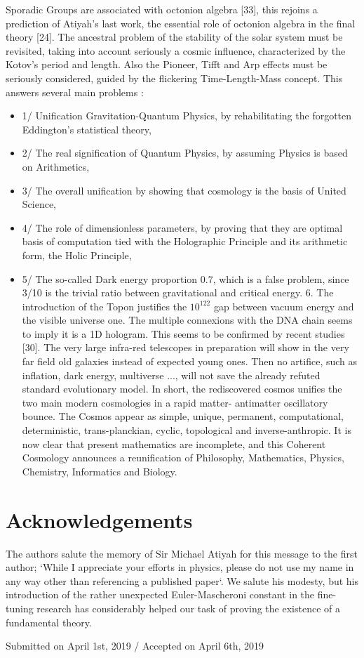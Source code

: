 \documentclass[twoside,draft]{article}
\begin{document}
\begin{sloppypar}
{Sporadic Groups are associated with octonion algebra [33], this rejoins a prediction of Atiyah's last
work, the essential role of octonion algebra in the final theory [24].
The ancestral problem of the stability of the solar system must be revisited, taking into account
seriously a cosmic influence, characterized by the Kotov's period and length. Also the Pioneer, Tifft
and Arp effects must be seriously considered, guided by the flickering Time-Length-Mass concept.
This answers several main problems : 
\begin{itemize}
\item 1/ Unification Gravitation-Quantum Physics, by
rehabilitating the forgotten Eddington's statistical theory, 
\item 2/ The real signification of Quantum
Physics, by assuming Physics is based on Arithmetics, 
\item 3/ The overall unification by showing that
cosmology is the basis of United Science, 
\item 4/ The role of dimensionless parameters, by proving that
they are optimal basis of computation tied with the Holographic Principle and its arithmetic form,
the Holic Principle, 
\item 5/ The so-called Dark energy proportion 0.7, which is a false problem, since
3/10 is the trivial ratio between gravitational and critical energy. 6. The introduction of the Topon
justifies the $10^{122}$ gap between vacuum energy and the visible universe one.
The multiple connexions with the DNA chain seems to imply it is a 1D hologram. This seems to
be confirmed by recent studies [30].
The very large infra-red telescopes in preparation will show in the very far field old galaxies
instead of expected young ones. Then no artifice, such as inflation, dark energy, multiverse ..., will
not save the already refuted standard evolutionary model.
In short, the rediscovered cosmos unifies the two main modern cosmologies in a rapid matter-
antimatter oscillatory bounce. The Cosmos appear as simple, unique, permanent, computational,
deterministic, trans-planckian, cyclic, topological and inverse-anthropic.
It is now clear that present mathematics are incomplete, and this Coherent Cosmology
announces a reunification of Philosophy, Mathematics, Physics, Chemistry, Informatics and
Biology.
\end{itemize}


\section*{Acknowledgements}
The authors salute the memory of Sir Michael Atiyah for this message to the
first author; `While I appreciate your efforts in physics, please do not use my name in any way
other than referencing a published paper`. We salute his modesty, but his introduction of the rather
unexpected Euler-Mascheroni constant in the fine-tuning research has considerably helped our task
of proving the existence of a fundamental theory.
%
\begin{flushright}\footnotesize
Submitted on April 1st, 2019 / Accepted on April 6th, 2019
\end{flushright}


}
\end{sloppypar}
\end{document}
